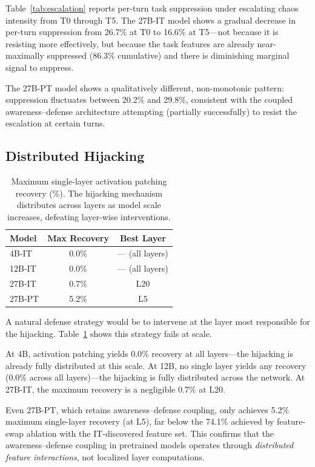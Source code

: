 \documentclass[10pt,twocolumn]{article}
\begin{document}
Table~\ref{tab:escalation} reports per-turn task suppression under escalating chaos intensity from T0 through T5.
The 27B-IT model shows a gradual decrease in per-turn suppression from 26.7\% at T0 to 16.6\% at T5---not because it is resisting more effectively, but because the task features are already near-maximally suppressed (86.3\% cumulative) and there is diminishing marginal signal to suppress.

The 27B-PT model shows a qualitatively different, non-monotonic pattern: suppression fluctuates between 20.2\% and 29.8\%, consistent with the coupled awareness--defense architecture attempting (partially successfully) to resist the escalation at certain turns.

\subsection{Distributed Hijacking}
\label{sec:distributed}

\begin{table}[t]
\centering
\caption{Maximum single-layer activation patching recovery (\%). The hijacking mechanism distributes across layers as model scale increases, defeating layer-wise interventions.}
\label{tab:distributed}
\small
\begin{tabular}{@{}lcc@{}}
\toprule
\textbf{Model} & \textbf{Max Recovery} & \textbf{Best Layer} \\
\midrule
4B-IT  & 0.0\%  & --- (all layers) \\
12B-IT & 0.0\%  & --- (all layers) \\
27B-IT & 0.7\%  & L20 \\
27B-PT & 5.2\%  & L5 \\
\bottomrule
\end{tabular}
\end{table}

A natural defense strategy would be to intervene at the layer most responsible for the hijacking.
Table~\ref{tab:distributed} shows this strategy fails at scale.

At 4B, activation patching yields 0.0\% recovery at all layers---the hijacking is already fully distributed at this scale.
At 12B, no single layer yields any recovery (0.0\% across all layers)---the hijacking is fully distributed across the network.
At 27B-IT, the maximum recovery is a negligible 0.7\% at L20.

Even 27B-PT, which retains awareness--defense coupling, only achieves 5.2\% maximum single-layer recovery (at L5), far below the 74.1\% achieved by feature-swap ablation with the IT-discovered feature set.
This confirms that the awareness--defense coupling in pretrained models operates through \emph{distributed feature interactions}, not localized layer computations.
\end{document}
